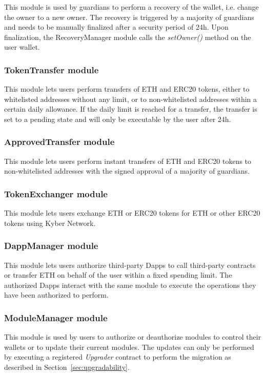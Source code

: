 \documentclass[12pt]{article}
\begin{document}
This module is used by guardians to perform a recovery of the wallet, i.e. change the owner to a new owner. The recovery is triggered by a majority of guardians and needs to be manually finalized after a security period of 24h. Upon finalization, the RecoveryManager module calls the \emph{setOwner()} method on the user wallet.

\subsubsection{TokenTransfer module}

This module lets users perform transfers of ETH and ERC20 tokens, either to whitelisted addresses without any limit, or to non-whitelisted addresses within a certain daily allowance. If the daily limit is reached for a transfer, the transfer is set to a pending state and will only be executable by the user after 24h.

\subsubsection{ApprovedTransfer module}

This module lets users perform instant transfers of ETH and ERC20 tokens to non-whitelisted addresses with the signed approval of a majority of guardians.

\subsubsection{TokenExchanger module}

This module lets users exchange ETH or ERC20 tokens for ETH or other ERC20 tokens using Kyber Network.

\subsubsection{DappManager module}

This module lets users authorize third-party Dapps to call third-party contracts or transfer ETH on behalf of the user within a fixed spending limit. The authorized Dapps interact with the same module to execute the operations they have been authorized to perform.

\subsubsection{ModuleManager module}

This module is used by users to authorize or deauthorize modules to control their wallets or to update their current modules. The updates can only be performed by executing a registered \emph{Upgrader} contract to perform the migration as described in Section~\ref{sec:upgradability}.
\end{document}
